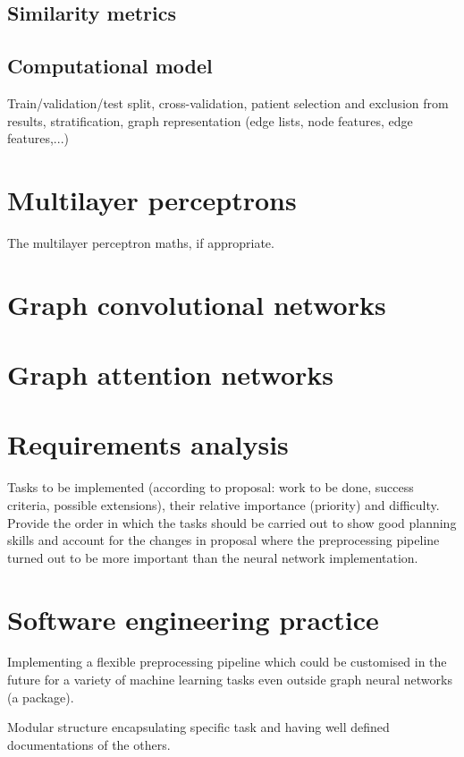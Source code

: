 \subsection{Similarity metrics}

\subsection{Computational model}
Train/validation/test split, cross-validation, patient selection and exclusion from results, stratification, graph representation (edge lists, node features, edge features,...)

\section{Multilayer perceptrons}
The multilayer perceptron maths, if appropriate.

\section{Graph convolutional networks}

\section{Graph attention networks}

\section{Requirements analysis}

Tasks to be implemented (according to proposal: work to be done, success criteria, possible extensions), their relative importance (priority) and difficulty. Provide the order in which the tasks should be carried out to show good planning skills and account for the changes in proposal where the preprocessing pipeline turned out to be more important than the neural network implementation.

\section{Software engineering practice}
Implementing a flexible preprocessing pipeline which could be customised in the future for a variety of machine learning tasks even outside graph neural networks (a package).

Modular structure encapsulating specific task and having well defined documentations of the others.

